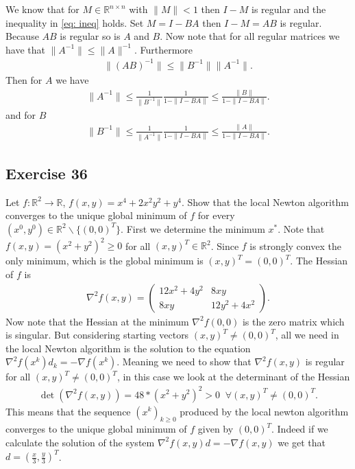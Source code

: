 We know that for $M \in \mathbb{R}^{n \times  n}$ with $\|M\|<1$ then $I-M$
is regular and the inequality in \ref{eq: ineq} holds. Set $M =
I-BA$ then $I-M=AB$ is regular. Because $AB$ is regular so is $A$ and $B$.
Now note that for all regular matrices we have that $\|A^{-1}\|\le
\|A\|^{-1}$. Furthermore
\begin{align}
    \|\left(AB  \right)^{-1}\| \le \|B^{-1}\|\|A^{-1}\|.
\end{align}
Then for $A$ we have
\begin{align}
    \|A^{-1}\|\le \frac{1}{\|B^{-1}\|}\frac{1}{1-\|I-BA\|}\le
    \frac{\|B\|}{1-\|I-BA\|}.
\end{align}
and for $B$
\begin{align}
    \|B^{-1}\|\le \frac{1}{\|A^{-1}\|}\frac{1}{1-\|I-BA\|}\le
    \frac{\|A\|}{1-\|I-BA\|}.
\end{align}
\subsection{Exercise 36}
Let $f:\mathbb{R}^{2}\to \mathbb{R}$, $f(x, y) = x^4 + 2x^2y^2 + y^4$. Show
that the local Newton algorithm converges to the unique global minimum of
$f$ for every $(x^0, y^0) \in \mathbb{R}^{2}\backslash\{(0, 0)^T\}$.
First we determine the minimum $x^*$. Note that $f(x, y) = \left( x^2 + y^2
\right)^2 \ge 0$ for all $(x, y)^T \in \mathbb{R}^{2}$. Since $f$ is strongly convex the
only minimum, which is the global minimum is $(x, y)^T = (0 ,0)^T$. The
Hessian of $f$ is
\begin{align}
    \nabla^2 f(x,y) = \begin{pmatrix}12x^2+4y^2 & 8xy\\ 8xy & 12y^2 + 4x^2
    \end{pmatrix}.
\end{align}
Now note that the Hessian at the minimum $\nabla^2f(0,0)$ is the zero matrix
which is singular. But considering starting vectors $(x, y)^T \neq (0,
0)^T$, all we need in the local Newton algorithm is the solution to the equation
$\nabla^2f(x^k)d_k = -\nabla f(x^k)$. Meaning we need to show that
$\nabla^2f(x,y)$ is regular for all $(x, y)^T \neq (0,0)^T$, in this
case we look at the determinant of the Hessian
\begin{align}
    \det(\nabla^2 f(x,y)) = 48*(x^2 + y^2)^2 > 0 \;\; \forall (x, y)^T \neq (0,
    0)^T.
\end{align}
This means that the sequence $(x^k)_{k\ge 0}$ produced by the local newton
algorithm converges to the unique global minimum of $f$ given by $(0, 0)^T$.
Indeed if we calculate the solution of the system $\nabla^2f(x,y)d =
-\nabla f(x,y)$ we get that $d = (\frac{x}{3}, \frac{y}{3})^T$.

